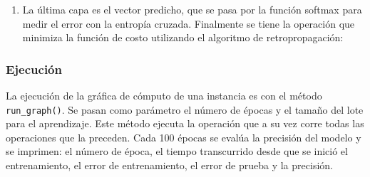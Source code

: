 \begin{enumerate}
\item La última capa es el vector predicho, que se pasa por la función softmax para
medir el error con la entropía cruzada. Finalmente se tiene la operación
 que minimiza la función de costo utilizando el algoritmo de
retropropagación:

%
\begin{sphinxVerbatim}[commandchars=\\\{\}]
   
   
  
   
\end{sphinxVerbatim}


\end{enumerate}


\subsubsection{Ejecución}

La ejecución de la gráfica de cómputo de una instancia
es con el método \texttt{run\_graph()}.
Se pasan como parámetro el número de épocas y el tamaño del lote
para el aprendizaje.
Este método ejecuta la operación
 que a su vez corre todas las operaciones que la preceden.
Cada 100 épocas se evalúa la precisión del modelo y se imprimen:
el número de época, el tiempo transcurrido desde que se inició el entrenamiento, el error de entrenamiento, el error de prueba y
la precisión.



